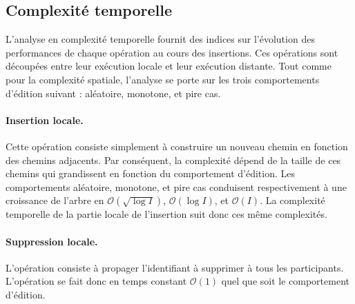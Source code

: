 \subsection{Complexité temporelle}

L'analyse en complexité temporelle fournit des indices sur l'évolution des
performances de chaque opération au cours des insertions. Ces opérations sont
découpées entre leur exécution locale et leur exécution distante. Tout comme
pour la complexité spatiale, l'analyse se porte sur les trois comportements
d'édition suivant : aléatoire, monotone, et pire cas.

\paragraph{Insertion locale.} Cette opération consiste simplement à construire
un nouveau chemin en fonction des chemins adjacents. Par conséquent, la
complexité dépend de la taille de ces chemins qui grandissent en fonction du
comportement d'édition. Les comportements aléatoire, monotone, et pire cas
conduisent respectivement à une croissance de l'arbre en
$\mathcal{O}(\sqrt{\log I})$, $\mathcal{O}(\log I)$, et $\mathcal{O}(I)$. La
complexité temporelle de la partie locale de l'insertion suit donc ces
même complexités.

\paragraph{Suppression locale.} L'opération consiste à propager l'identifiant à
supprimer à tous les participants. L'opération se fait donc en temps constant
$\mathcal{O}(1)$ quel que soit le comportement d'édition.

